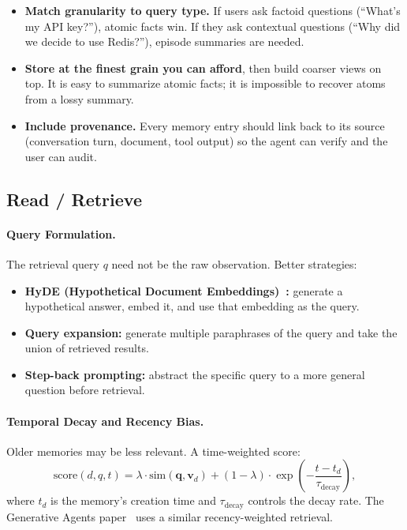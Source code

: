 \begin{itemize}
  \item \textbf{Match granularity to query type.} If users ask factoid questions (``What’s my API key?''), atomic facts win. If they ask contextual questions (``Why did we decide to use Redis?''), episode summaries are needed.
  \item \textbf{Store at the finest grain you can afford}, then build coarser views on top. It is easy to summarize atomic facts; it is impossible to recover atoms from a lossy summary.
  \item \textbf{Include provenance.} Every memory entry should link back to its source (conversation turn, document, tool output) so the agent can verify and the user can audit.
\end{itemize}

\subsection{Read / Retrieve}
\label{read-retrieve}

\paragraph{Query Formulation.}
\label{query-formulation.}

The retrieval query $q$ need not be the raw observation. Better strategies:

\begin{itemize}
  \item \textbf{HyDE (Hypothetical Document Embeddings)~\cite{gao2022precise}:} generate a hypothetical answer, embed it, and use that embedding as the query.
  \item \textbf{Query expansion:} generate multiple paraphrases of the query and take the union of retrieved results.
  \item \textbf{Step-back prompting:} abstract the specific query to a more general question before retrieval.
\end{itemize}

\paragraph{Temporal Decay and Recency Bias.}
\label{temporal-decay-and-recency-bias.}

Older memories may be less relevant. A time-weighted score: 
\[
\text{score}(d, q, t) = \lambda \cdot \text{sim}(\mathbf{q}, \mathbf{v}_d) + (1-\lambda) \cdot \exp\!\left(-\frac{t - t_d}{\tau_\text{decay}}\right),
\]
 where $t_d$ is the memory’s creation time and $\tau_\text{decay}$ controls the decay rate. The Generative Agents paper~\cite{park2023generative} uses a similar recency-weighted retrieval.


